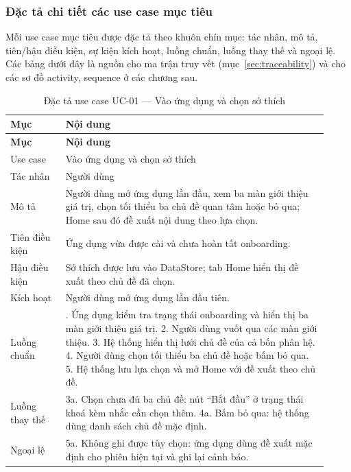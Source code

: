 \subsubsection{Đặc tả chi tiết các use case mục tiêu}

Mỗi use case mục tiêu được đặc tả theo khuôn chín mục: tác nhân, mô tả, tiên/hậu điều kiện,
sự kiện kích hoạt, luồng chuẩn, luồng thay thế và ngoại lệ. Các bảng dưới đây là nguồn cho
ma trận truy vết (mục~\ref{sec:traceability}) và cho các sơ đồ activity, sequence ở các chương sau.


\begingroup\small\renewcommand{\arraystretch}{1.15}\setlength{\tabcolsep}{3pt}
\begin{longtable}{>{\RaggedRight\arraybackslash}p{0.16\linewidth}>{\RaggedRight\arraybackslash}p{0.76\linewidth}}
\caption{Đặc tả use case UC-01 --- Vào ứng dụng và chọn sở thích}
\label{tab:spec-uc-01}\\
\toprule
\textbf{Mục} & \textbf{Nội dung} \\
\midrule
\endfirsthead
\toprule
\textbf{Mục} & \textbf{Nội dung} \\
\midrule
\endhead
\bottomrule
\endfoot
Use case & Vào ứng dụng và chọn sở thích \\
Tác nhân & Người dùng \\
Mô tả & Người dùng mở ứng dụng lần đầu, xem ba màn giới thiệu giá trị, chọn tối thiểu ba chủ đề quan tâm hoặc bỏ qua; Home sau đó đề xuất nội dung theo lựa chọn. \\
Tiên điều kiện & Ứng dụng vừa được cài và chưa hoàn tất onboarding. \\
Hậu điều kiện & Sở thích được lưu vào DataStore; tab Home hiển thị đề xuất theo chủ đề đã chọn. \\
Kích hoạt & Người dùng mở ứng dụng lần đầu tiên. \\
Luồng chuẩn & 1. Ứng dụng kiểm tra trạng thái onboarding và hiển thị ba màn giới thiệu giá trị. 2. Người dùng vuốt qua các màn giới thiệu. 3. Hệ thống hiển thị lưới chủ đề của cả bốn phân hệ. 4. Người dùng chọn tối thiểu ba chủ đề hoặc bấm bỏ qua. 5. Hệ thống lưu lựa chọn và mở Home với đề xuất theo chủ đề. \\
Luồng thay thế & 3a. Chọn chưa đủ ba chủ đề: nút “Bắt đầu” ở trạng thái khoá kèm nhắc cần chọn thêm. 4a. Bấm bỏ qua: hệ thống dùng danh sách chủ đề mặc định. \\
Ngoại lệ & 5a. Không ghi được tùy chọn: ứng dụng dùng đề xuất mặc định cho phiên hiện tại và ghi lại cảnh báo. \\
\end{longtable}
\endgroup

